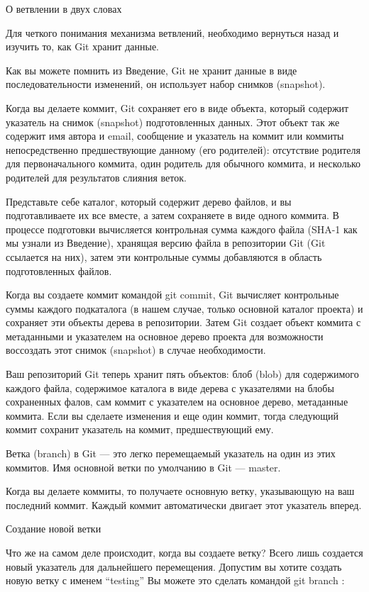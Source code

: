 \documentclass{../industrial-development}
\begin{document}
\lecturenotes

О ветвлении в двух словах

Для четкого понимания механизма ветвлений, необходимо вернуться назад и изучить то, как Git хранит данные.

Как вы можете помнить из Введение, Git не хранит данные в виде последовательности изменений, он использует набор снимков (snapshot).

Когда вы делаете коммит, Git сохраняет его в виде объекта, который содержит указатель на снимок (snapshot) подготовленных данных. Этот объект так же содержит имя автора и email, сообщение и указатель на коммит или коммиты непосредственно предшествующие данному (его родителей): отсутствие родителя для первоначального коммита, один родитель для обычного коммита, и несколько родителей для результатов слияния веток.

Представьте себе каталог, который содержит дерево файлов, и вы подготавливаете их все вместе, а затем сохраняете в виде одного коммита. В процессе подготовки вычисляется контрольная сумма каждого файла (SHA-1 как мы узнали из Введение), хранящая версию файла в репозитории Git (Git ссылается на них), затем эти контрольные суммы добавляются в область подготовленных файлов.

Когда вы создаете коммит командой git commit, Git вычисляет контрольные суммы каждого подкаталога (в нашем случае, только основной каталог проекта) и сохраняет эти объекты дерева в репозитории. Затем Git создает объект коммита с метаданными и указателем на основное дерево проекта для возможности воссоздать этот снимок (snapshot) в случае необходимости.

Ваш репозиторий Git теперь хранит пять объектов: блоб (blob) для содержимого каждого файла, содержимое каталога в виде дерева с указателями на блобы сохраненных фалов, сам коммит с указателем на основное дерево, метаданные коммита.
Если вы сделаете изменения и еще один коммит, тогда следующий коммит сохранит указатель на коммит, предшествующий ему.

Ветка (branch) в Git — это легко перемещаемый указатель на один из этих коммитов. Имя основной ветки по умолчанию в Git — master.

Когда вы делаете коммиты, то получаете основную ветку, указывающую на ваш последний коммит. Каждый коммит автоматически двигает этот указатель вперед.

Создание новой ветки

Что же на самом деле происходит, когда вы создаете ветку? Всего лишь создается новый указатель для дальнейшего перемещения. Допустим вы хотите создать новую ветку с именем “testing” Вы можете это сделать командой git branch :
\end{document}
